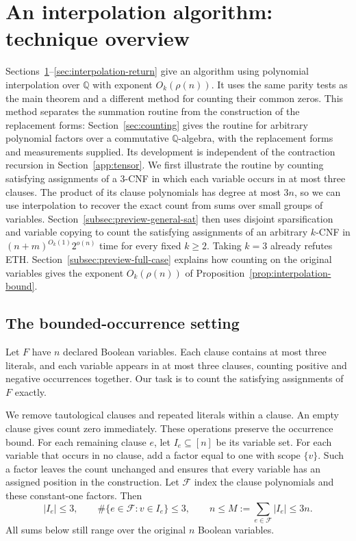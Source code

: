 \section{An interpolation algorithm: technique overview}\label{sec:technical-overview}
Sections~\ref{sec:technical-overview}--\ref{sec:interpolation-return}
give an algorithm using polynomial interpolation over $\mathbb Q$ with exponent $O_k(\rho(n))$.
It uses the same parity tests as the main theorem and a different
method for counting their common zeros. This method separates the
summation routine from the construction of the replacement forms:
Section~\ref{sec:counting} gives the routine for arbitrary polynomial
factors over a commutative $\mathbb Q$-algebra, with the replacement
forms and measurements supplied. Its development is independent of
the contraction recursion in Section~\ref{app:tensor}.
We first illustrate the routine by counting satisfying assignments
of a $3$-CNF in which each variable occurs in at most three clauses. The product of its clause
polynomials has degree at most $3n$, so we can use interpolation to
recover the exact count from sums over small groups of variables.
Section~\ref{subsec:preview-general-sat} then uses disjoint
sparsification and variable copying to count the satisfying assignments
of an arbitrary $k$-CNF in $(n+m)^{O_k(1)}2^{o(n)}$ time for every
fixed $k\ge2$. Taking $k=3$ already refutes ETH.
Section~\ref{subsec:preview-full-case} explains how counting on the
original variables gives the exponent $O_k(\rho(n))$ of
Proposition~\ref{prop:interpolation-bound}.

\subsection{The bounded-occurrence setting}\label{subsec:preview-setting}
Let $F$ have $n$ declared Boolean variables. Each clause contains
at most three literals, and each variable appears in at most
three clauses, counting positive and negative occurrences together.
Our task is to count the satisfying assignments of $F$ exactly.

We remove tautological clauses and repeated literals within a
clause. An empty clause gives count zero immediately.
These operations preserve the occurrence bound. For each remaining
clause $e$, let $I_e\subseteq[n]$ be its variable set.
For each variable that occurs in no clause, add a factor equal to
one with scope $\{v\}$. Such a factor leaves the count unchanged
and ensures that every variable has an assigned position in the
construction.
Let $\mathcal F$ index the clause polynomials and these constant-one factors. Then
\begin{equation}\label{eq:overview-incidences}
 |I_e|\le3,\qquad
 \#\{e\in\mathcal F:v\in I_e\}\le3,\qquad
 n\le M:=\sum_{e\in\mathcal F}|I_e|\le3n.
\end{equation}
All sums below still range over the original $n$ Boolean variables.

